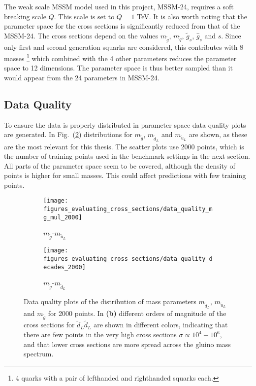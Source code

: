 \documentclass[twoside,english]{uiofysmaster}
\begin{document}
The weak scale MSSM model used in this project, MSSM-24, requires a soft breaking scale $Q$. This scale is set to $Q=1$ TeV. It is also worth noting that the parameter space for the cross sections is significantly reduced from that of the MSSM-24. The cross sections depend on the values $m_{\tilde{g}}$, $m_{\tilde{q}}$, $\tilde{g}_s$, $\hat{g}_s$ and $s$. Since only first and second generation squarks are considered, this contributes with 8 masses \footnote{4 quarks with a pair of lefthanded and righthanded squarks each.} which combined with the 4 other parameters reduces the parameter space to 12 dimensions. The parameter space is thus better sampled than it would appear from the 24 parameters in MSSM-24.

\subsection{Data Quality}

To ensure the data is properly distributed in parameter space data quality plots are generated. In Fig.\ (\ref{Fig:: evaluating cross : Data quality}) distributions for $m_{\tilde{g}}$, $m_{\tilde{d}_L}$ and $m_{\tilde{u}_L}$ are shown, as these are the most relevant for this thesis. The scatter plots use 2000 points, which is the number of training points used in the benchmark settings in the next section. All parts of the parameter space seem to be covered, although the density of points is higher for small masses. This could affect predictions with few training points.

\begin{figure}
    \centering
    \begin{subfigure}[b]{0.4\textwidth}
        \texttt{[image: figures\_evaluating\_cross\_sections/data\_quality\_mg\_mul\_2000]}
        \caption{$m_{\tilde{g}}$-$m_{\tilde{u}_L}$}
    \end{subfigure}
    \begin{subfigure}[b]{0.5\textwidth}
        \texttt{[image: figures\_evaluating\_cross\_sections/data\_quality\_decades\_2000]}
        \caption{$m_{\tilde{g}}$-$m_{\tilde{d}_L}$}
        \label{Fig :: evaluating cross : dq b}
    \end{subfigure}
    \caption{Data quality plots of the distribution of mass parameters $m_{\tilde{d}_L}$, $m_{\tilde{u}_L}$ and $m_{\tilde{g}}$ for 2000 points. In \textbf{(b)} different orders of magnitude of the cross sections for $\tilde{d}_L \tilde{d}_L$ are shown in different colors, indicating that there are few points in the very high cross sections $\sigma \propto 10^{4}-10^{6}$, and that lower cross sections are more spread across the gluino mass spectrum. }
    \label{Fig:: evaluating cross : Data quality}
\end{figure}
\end{document}
